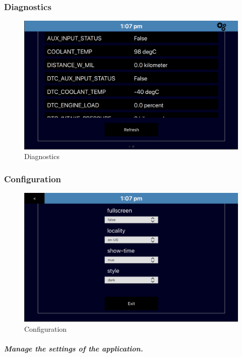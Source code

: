 \documentclass{article}
\begin{document}
\hypertarget{diagnostics}{%
\subsubsection{Diagnostics}\label{diagnostics}}

\begin{figure}
\centering
\includegraphics{./resources/diagnostics.png}
\caption{Diagnostics}
\end{figure}

\hypertarget{configuration}{%
\subsubsection{Configuration}\label{configuration}}

\begin{figure}
\centering
\includegraphics{./resources/configuration.png}
\caption{Configuration}
\end{figure}




\subparagraph{Manage the settings of the application.}
\end{document}
